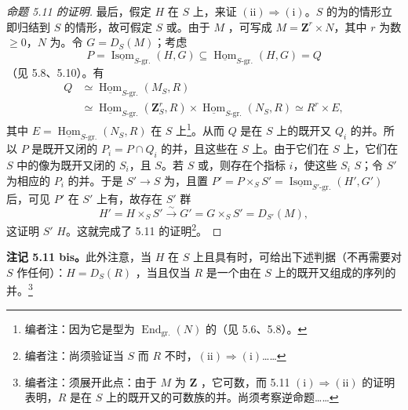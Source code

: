 \begin{proof}[命题 5.11 的证明]
最后，假定 $H$ 在 $S$ 上，来证 $(\mathrm{ii})\Rightarrow(\mathrm i)$。$S$ 的为的情形立即归结到 $S$ 的情形，故可假定 $S$ 或。由于 $M$ ，可写成 $M=\mathbf Z^r\times N$，其中 $r$ 为数 $\geq0$，$N$ 为。令 $G=D_S(M)$；考虑
\[
P=\underline{\operatorname{Isom}}_{S\text{-gr.}}(H,G)
\subseteq\underline{\operatorname{Hom}}_{S\text{-gr.}}(H,G)=Q
\]
（见 5.8、5.10）。有
\[
\begin{split}
Q&\simeq\underline{\operatorname{Hom}}_{S\text{-gr.}}(M_S,R)\\
&\simeq\underline{\operatorname{Hom}}_{S\text{-gr.}}(\mathbf Z_S^r,R)
\times\underline{\operatorname{Hom}}_{S\text{-gr.}}(N_S,R)
\simeq R^r\times E,
\end{split}
\]
其中 $E=\underline{\operatorname{Hom}}_{S\text{-gr.}}(N_S,R)$ 在 $S$ 上\footnote[42]{编者注：因为它是型为 $\operatorname{End}_{\mathrm{gr.}}(N)$ 的（见 5.6、5.8）。}。从而 $Q$ 是在 $S$ 上的既开又 $Q_i$ 的并。所以 $P$ 是既开又闭的 $P_i=P\cap Q_i$ 的并，且这些在 $S$ 上。由于它们在 $S$ 上，它们在 $S$ 中的像为既开又闭的 $S_i$，且 $S$。若 $S$ 或，则存在个指标 $i$，使这些 $S_i$  $S$；令 $S'$ 为相应的 $P_i$ 的并。于是 $S'\to S$ 为，且置 $P'=P\times_S S'=\underline{\operatorname{Isom}}_{S'\text{-gr.}}(H',G')$ 后，可见 $P'$ 在 $S'$ 上有，故存在 $S'$ 群
\[
H'=H\times_S S'\xrightarrow{\sim}G'=G\times_S S'=D_{S'}(M),
\]
这证明 $S'$  $H$。这就完成了 5.11 的证明\footnote[43]{编者注：尚须验证当 $S$ 而 $R$ 不时，$(\mathrm{ii})\Rightarrow(\mathrm i)$……}。
\end{proof}
\textbf{注记 5.11 bis。}此外注意，当 $H$ 在 $S$ 上且具有时，可给出下述判据（不再需要对 $S$ 作任何）：$H=D_S(R)$ ，当且仅当 $R$ 是一个由在 $S$ 上的既开又组成的序列的并。\footnote[44]{编者注：须展开此点：由于 $M$ 为 $\mathbf Z$ ，它可数，而 5.11 $(\mathrm i)\Rightarrow(\mathrm{ii})$ 的证明表明，$R$ 是在 $S$ 上的既开又的可数族的并。尚须考察逆命题……}

